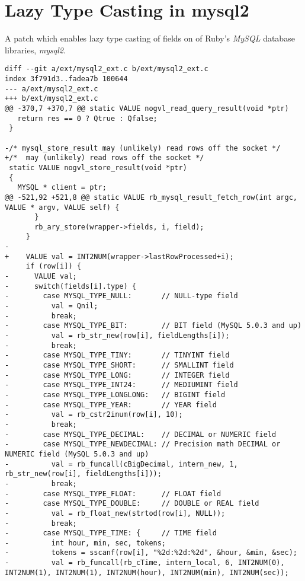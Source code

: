 \chapter{Lazy Type Casting in mysql2} %
\label{ap:mysql2_patch}

A patch which enables lazy type casting of fields on of Ruby's \textit{MySQL} database libraries, \textit{mysql2}.

\begin{lstlisting}
diff --git a/ext/mysql2_ext.c b/ext/mysql2_ext.c
index 3f791d3..fadea7b 100644
--- a/ext/mysql2_ext.c
+++ b/ext/mysql2_ext.c
@@ -370,7 +370,7 @@ static VALUE nogvl_read_query_result(void *ptr)
   return res == 0 ? Qtrue : Qfalse;
 }
 
-/* mysql_store_result may (unlikely) read rows off the socket */
+/*  may (unlikely) read rows off the socket */
 static VALUE nogvl_store_result(void *ptr)
 {
   MYSQL * client = ptr;
@@ -521,92 +521,8 @@ static VALUE rb_mysql_result_fetch_row(int argc, VALUE * argv, VALUE self) {
       }
       rb_ary_store(wrapper->fields, i, field);
     }
-
+    VALUE val = INT2NUM(wrapper->lastRowProcessed+i);
     if (row[i]) {
-      VALUE val;
-      switch(fields[i].type) {
-        case MYSQL_TYPE_NULL:       // NULL-type field
-          val = Qnil;
-          break;
-        case MYSQL_TYPE_BIT:        // BIT field (MySQL 5.0.3 and up)
-          val = rb_str_new(row[i], fieldLengths[i]);
-          break;
-        case MYSQL_TYPE_TINY:       // TINYINT field
-        case MYSQL_TYPE_SHORT:      // SMALLINT field
-        case MYSQL_TYPE_LONG:       // INTEGER field
-        case MYSQL_TYPE_INT24:      // MEDIUMINT field
-        case MYSQL_TYPE_LONGLONG:   // BIGINT field
-        case MYSQL_TYPE_YEAR:       // YEAR field
-          val = rb_cstr2inum(row[i], 10);
-          break;
-        case MYSQL_TYPE_DECIMAL:    // DECIMAL or NUMERIC field
-        case MYSQL_TYPE_NEWDECIMAL: // Precision math DECIMAL or NUMERIC field (MySQL 5.0.3 and up)
-          val = rb_funcall(cBigDecimal, intern_new, 1, rb_str_new(row[i], fieldLengths[i]));
-          break;
-        case MYSQL_TYPE_FLOAT:      // FLOAT field
-        case MYSQL_TYPE_DOUBLE:     // DOUBLE or REAL field
-          val = rb_float_new(strtod(row[i], NULL));
-          break;
-        case MYSQL_TYPE_TIME: {     // TIME field
-          int hour, min, sec, tokens;
-          tokens = sscanf(row[i], "%2d:%2d:%2d", &hour, &min, &sec);
-          val = rb_funcall(rb_cTime, intern_local, 6, INT2NUM(0), INT2NUM(1), INT2NUM(1), INT2NUM(hour), INT2NUM(min), INT2NUM(sec));

\end{lstlisting}
